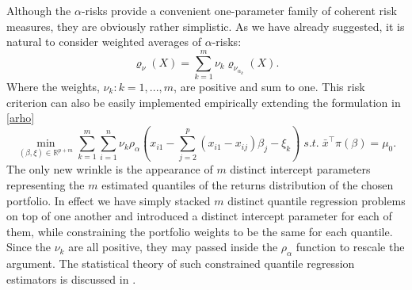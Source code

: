\documentclass{birkart}
\theoremstyle{definition}
\theoremstyle{remark}
\numberwithin{equation}{section}
\def\RR{\mathbb{R}}
\begin{document}

Although the $\alpha$-risks provide a convenient one-parameter family of
coherent risk measures, they are obviously rather simplistic.  As we have
already suggested, it is natural to consider weighted averages of
$\alpha$-risks:
\[
\varrho_\nu (X) = \sum_{k=1}^m \nu_k \varrho_{\nu_{\alpha_k}} (X).
\]
Where the weights, $\nu_k : k=1, ... , m$, are positive and sum to one.
This risk criterion can also be easily implemented empirically
extending the formulation in \eqref{arho}
\begin{equation}\label{nurho}
\min_{(\beta,\xi) \in \RR^{p+m} } \sum_{k=1}^m \sum_{i=1}^n \nu_k
\rho_{\alpha} (x_{i1} - \sum_{j=2}^p (x_{i1}-x_{ij})\beta_j -\xi_k)
\; s.t. \; \bar x^\top \pi (\beta) =\mu_0.
\end{equation}
The only new wrinkle is the appearance of $m$ distinct intercept parameters
representing the $m$ estimated quantiles of the returns distribution of the
chosen portfolio.  In effect we
have simply stacked $m$ distinct quantile regression problems on top
of one another and introduced a distinct intercept parameter for each of
them, while constraining the portfolio weights to be the same for each
quantile.  Since the $\nu_k$ are all positive, they may passed inside
the $\rho_\alpha$ function to rescale the argument.  The statistical
theory of such constrained quantile regression estimators is discussed
in .
\end{document}
